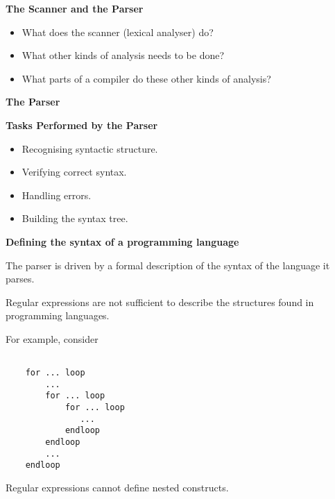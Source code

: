 \setcounter{slide}{57}

%
%
\begin{slide}{}
{\bf The Scanner and the Parser}
\begin{itemize}

\item What does the scanner (lexical analyser) do?

\item What other kinds of analysis needs to be done?
      
\item What parts of a compiler do these other kinds of analysis?

\end{itemize}
\end{slide}

%
%
\begin{slide}{}
{\bf The Parser}

\vspace{3ex}
\end{slide}
%
%
\begin{slide}{}
{\bf Tasks Performed by the Parser}
\begin{itemize}
\item Recognising syntactic structure.
\item Verifying correct syntax.
\item Handling errors.
\item Building the syntax tree.
\end{itemize}
\end{slide}
%
%
\begin{slide}{}
{\small
{\bf Defining the syntax of a programming language}

The parser is driven by a formal description of the
syntax of the language it parses.

Regular expressions are not sufficient to describe
the structures found in programming languages.

For example, consider
\begin{verbatim}

    for ... loop
        ...
        for ... loop
            for ... loop
               ...
            endloop
        endloop
        ...
    endloop

\end{verbatim}

Regular expressions cannot define nested constructs. 
}
\end{slide}
%
